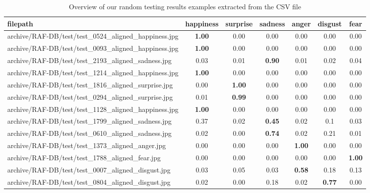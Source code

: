 \begin{table}[ht]
  \centering
  \begin{tabular}{@{}lcccccc@{}}
  \toprule
  filepath & happiness & surprise & sadness & anger & disgust & fear \\
  \midrule
  archive/RAF-DB/test/test\_0524\_aligned\_happiness.jpg & \textbf{1.00} & 0.00 & 0.00 & 0.00 & 0.00 & 0.00 \\
  archive/RAF-DB/test/test\_0093\_aligned\_happiness.jpg & \textbf{1.00} & 0.00 & 0.00 & 0.00 & 0.00 & 0.00 \\
  archive/RAF-DB/test/test\_2193\_aligned\_sadness.jpg & 0.03 & 0.01 & \textbf{0.90} & 0.01 & 0.02 & 0.04 \\
  archive/RAF-DB/test/test\_1214\_aligned\_happiness.jpg & \textbf{1.00} & 0.00 & 0.00 & 0.00 & 0.00 & 0.00 \\
  archive/RAF-DB/test/test\_1816\_aligned\_surprise.jpg & 0.00 & \textbf{1.00} & 0.00 & 0.00 & 0.00 & 0.00 \\
  archive/RAF-DB/test/test\_0294\_aligned\_surprise.jpg & 0.01 & \textbf{0.99} & 0.00 & 0.00 & 0.00 & 0.00 \\
  archive/RAF-DB/test/test\_1128\_aligned\_happiness.jpg & \textbf{1.00} & 0.00 & 0.00 & 0.00 & 0.00 & 0.00 \\
  archive/RAF-DB/test/test\_1799\_aligned\_sadness.jpg & 0.37 & 0.02 & \textbf{0.45} & 0.02 & 0.1 & 0.03 \\
  archive/RAF-DB/test/test\_0610\_aligned\_sadness.jpg & 0.02 & 0.00 & \textbf{0.74} & 0.02 & 0.21 & 0.01 \\
  archive/RAF-DB/test/test\_1373\_aligned\_anger.jpg & 0.00 & 0.00 & 0.00 & \textbf{1.00} & 0.00 & 0.00 \\
  archive/RAF-DB/test/test\_1788\_aligned\_fear.jpg & 0.00 & 0.00 & 0.00 & 0.00 & 0.00 & \textbf{1.00} \\
  archive/RAF-DB/test/test\_0007\_aligned\_disgust.jpg & 0.03 & 0.05 & 0.03 & \textbf{0.58} & 0.18 & 0.13 \\
  archive/RAF-DB/test/test\_0804\_aligned\_disgust.jpg & 0.02 & 0.00 & 0.18 & 0.02 & \textbf{0.77} & 0.00 \\
  \bottomrule
  \end{tabular}
  \caption{Overview of our random testing results examples extracted from the CSV file}
  \label{tab:testcsv}
\end{table}  


